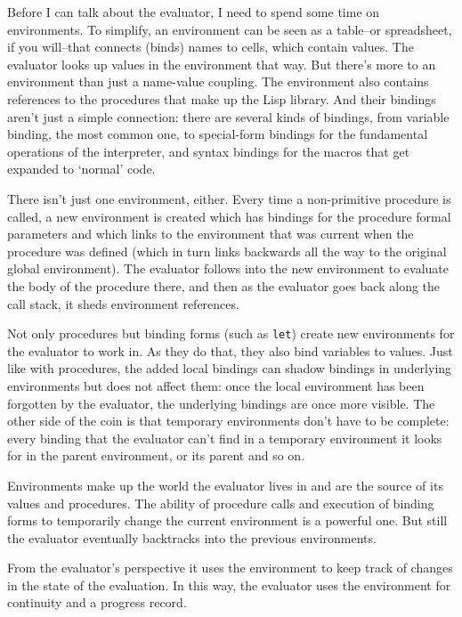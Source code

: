 \documentclass[twoside]{report}
\begin{document}
Before I can talk about the evaluator, I need to spend some time on environments. To simplify, an environment can be seen as a table--or spreadsheet, if you will--that connects (binds) names to cells, which contain values. The evaluator looks up values in the environment that way. But there's more to an environment than just a name-value coupling. The environment also contains references to the procedures that make up the Lisp library. And their bindings aren't just a simple connection: there are several kinds of bindings, from variable binding, the most common one, to special-form bindings for the fundamental operations of the interpreter, and syntax bindings for the macros that get expanded to `normal' code.

There isn't just one environment, either. Every time a non-primitive procedure is called, a new environment is created which has bindings for the procedure formal parameters and which links to the environment that was current when the procedure was defined (which in turn links backwards all the way to the original global environment). The evaluator follows into the new environment to evaluate the body of the procedure there, and then as the evaluator goes back along the call stack, it sheds environment references.

Not only procedures but binding forms (such as \texttt{let}) create new environments for the evaluator to work in. As they do that, they also bind variables to values. Just like with procedures, the added local bindings can shadow bindings in underlying environments but does not affect them: once the local environment has been forgotten by the evaluator, the underlying bindings are once more visible. The other side of the coin is that temporary environments don't have to be complete: every binding that the evaluator can't find in a temporary environment it looks for in the parent environment, or its parent and so on.

Environments make up the world the evaluator lives in and are the source of its values and procedures. The ability of procedure calls and execution of binding forms to temporarily change the current environment is a powerful one. But still the evaluator eventually backtracks into the previous environments.

From the evaluator's perspective it uses the environment to keep track of changes in the state of the evaluation. In this way, the evaluator uses the environment for continuity and a progress record.
\end{document}
